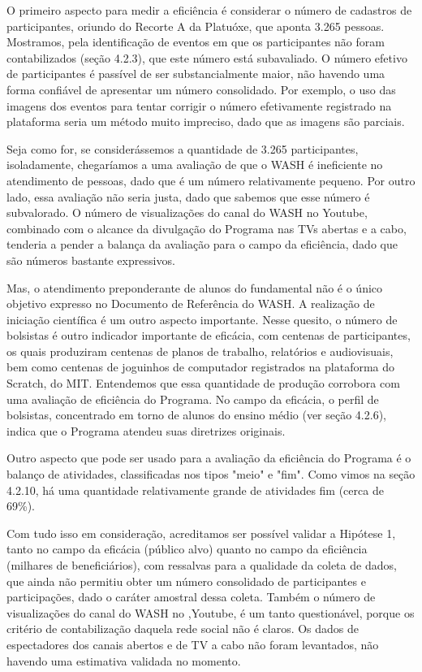 O primeiro aspecto para medir a eficiência é considerar o número de cadastros de participantes, oriundo do Recorte A da Platuóxe, que aponta 3.265 pessoas. Mostramos, pela identificação de eventos em que os participantes não foram contabilizados (seção 4.2.3), que este número está subavaliado. O número efetivo de participantes é passível de ser substancialmente maior, não havendo uma forma confiável de apresentar um número consolidado. Por exemplo, o uso das imagens dos eventos para tentar corrigir o número efetivamente registrado na plataforma seria um método muito impreciso, dado que as imagens são parciais.

Seja como for, se considerássemos a quantidade de 3.265 participantes, isoladamente, chegaríamos a uma avaliação de que o WASH é ineficiente no atendimento de pessoas, dado que é um número relativamente pequeno. Por outro lado, essa avaliação não seria justa, dado que sabemos que esse número é subvalorado. O número de visualizações do canal do WASH no Youtube, combinado com o alcance da divulgação do Programa nas TVs abertas e a cabo, tenderia a pender a balança da avaliação para o campo da eficiência, dado que são números bastante expressivos.

Mas, o atendimento preponderante de alunos do fundamental não é o único objetivo expresso no Documento de Referência do WASH. A realização de iniciação científica é um outro aspecto importante. Nesse quesito, o número de bolsistas é outro indicador importante de eficácia, com centenas de participantes, os quais produziram centenas de planos de trabalho, relatórios e audiovisuais, bem como centenas de joguinhos de computador registrados na plataforma do Scratch, do MIT. Entendemos que essa quantidade de produção corrobora com uma avaliação de eficiência do Programa. No campo da eficácia, o perfil de bolsistas, concentrado em torno de alunos do ensino médio (ver seção 4.2.6), indica que o Programa atendeu suas diretrizes originais.

Outro aspecto que pode ser usado para a avaliação da eficiência do Programa é o balanço de atividades, classificadas nos tipos "meio" e "fim". Como vimos na seção 4.2.10, há uma quantidade relativamente grande de atividades fim (cerca de 69\%).

Com tudo isso em consideração, acreditamos ser possível validar a Hipótese 1, tanto no campo da eficácia (público alvo) quanto no campo da eficiência (milhares de beneficiários), com ressalvas para a qualidade da coleta de dados, que ainda não permitiu obter um número consolidado de participantes e participações, dado o caráter amostral dessa coleta. Também o número de visualizações do canal do WASH no ,Youtube, é um tanto questionável, porque os critério de contabilização daquela rede social não é claros. Os dados de espectadores dos canais abertos e de TV a cabo não foram levantados, não havendo uma estimativa validada no momento.

